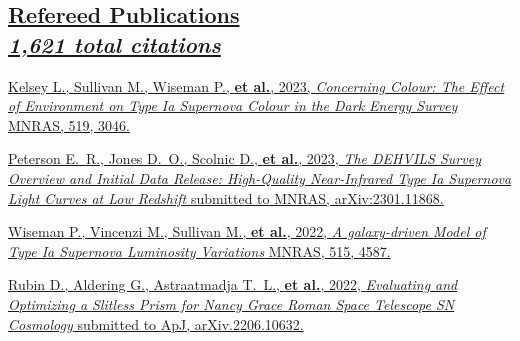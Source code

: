 \documentclass[margin]{res}
\begin{document}
\begin{resume}
\section{
\href{https://ui.adsabs.harvard.edu/search/filter_property_fq_property=AND&filter_property_fq_property=property\%3A\%22refereed\%22&fq=\%7B!type\%3Daqp\%20v\%3D\%24fq_property\%7D&fq_property=(property\%3A\%22refereed\%22)&p_=0&q=orcid\%3A0000-0002-1873-8973&sort=citation_count\%20desc\%2C\%20bibcode\%20desc}
{Refereed Publications\\  
\normalfont \textit{\small{\hspace{-0.3em}
1,621 total citations
}}}
}


\hangindent=15pt 
\href{https://academic.oup.com/mnras/article/519/2/3046/6939845}{Kelsey L., Sullivan M., Wiseman P., \textbf{et al.}, 2023, {\sl Concerning Colour: The Effect of Environment on Type Ia Supernova Colour in the Dark Energy Survey} MNRAS, 519, 3046.}
\vspace{-24pt}

\hangindent=15pt 
\href{https://ui.adsabs.harvard.edu/link_gateway/2023arXiv230111868P/EPRINT_HTML}{Peterson E.~R., Jones D.~O., Scolnic D., \textbf{et al.}, 2023, {\sl The DEHVILS Survey Overview and Initial Data Release: High-Quality Near-Infrared Type Ia Supernova Light Curves at Low Redshift} submitted to MNRAS, arXiv:2301.11868.}
\vspace{-12pt}

\hangindent=15pt 
\href{https://ui.adsabs.harvard.edu/link_gateway/2022MNRAS.515.4587W/PUB_HTML}{Wiseman P., Vincenzi M., Sullivan M., \textbf{et al.}, 2022, {\sl A galaxy-driven Model of Type Ia Supernova Luminosity Variations} MNRAS, 515, 4587.}
\vspace{-12pt}

\hangindent=15pt 
\href{https://ui.adsabs.harvard.edu/link_gateway/2022arXiv220610632R/EPRINT_HTML}{Rubin D., Aldering G., Astraatmadja T.~L., \textbf{et al.}, 2022, {\sl Evaluating and Optimizing a Slitless Prism for Nancy Grace Roman Space Telescope SN Cosmology} submitted to ApJ, arXiv.2206.10632.}
\vspace{-12pt}


\end{resume}
\end{document}
